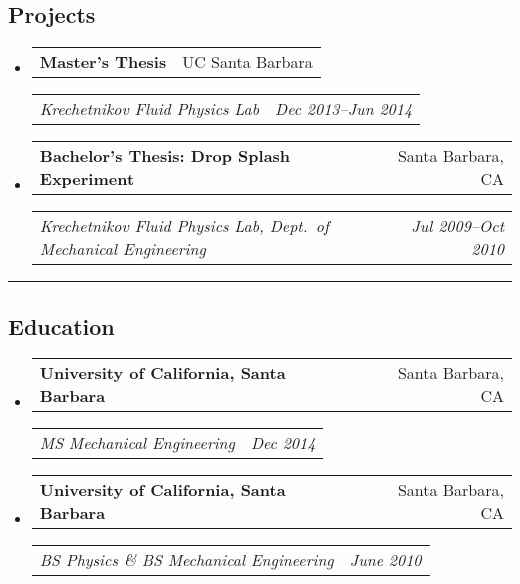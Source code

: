 \documentclass[10pt,letterpaper]{article}
\makeatletter
\newcommand{\headerrow}[2]{
\begin{tabular*}{\linewidth}{l@{\extracolsep{\fill}}r}
		#1 &
		#2 \\
	\end{tabular*}
}
\newcommand{\jobitem}[4]{\item \headerrow{\textbf{#1}}{#2}
\headerrow{\emph{#3}}{\emph{#4}}}
\makeatother
\begin{document}
\subsection*{Projects}
\begin{itemize}
	\jobitem{Master's Thesis}{UC Santa Barbara}
		    {Krechetnikov Fluid Physics Lab}{Dec 2013--Jun 2014}
	
	\jobitem{Bachelor's Thesis: Drop Splash Experiment}{Santa Barbara, CA}
		    {Krechetnikov Fluid Physics Lab, Dept.~of Mechanical Engineering}{Jul 2009--Oct 2010}
	
\end{itemize}

\hrule
\subsection*{Education}
\begin{itemize}
	\jobitem{University of California, Santa Barbara}{Santa Barbara, CA}
		    {MS  Mechanical Engineering}{Dec 2014}
	\jobitem{University of California, Santa Barbara}{Santa Barbara, CA}	
		    {BS Physics \&  BS Mechanical Engineering}{June 2010}
\end{itemize}
\end{document}
